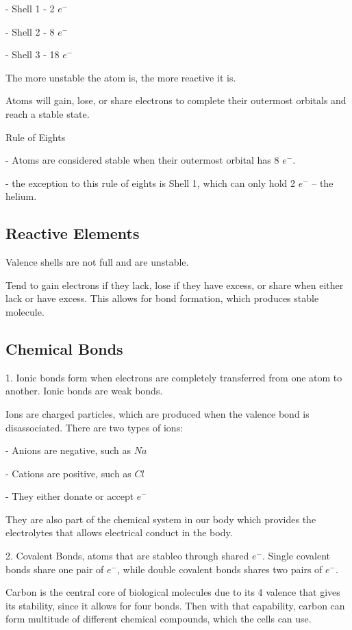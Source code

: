 \documentclass[12pt, UTF8]{article}
\begin{document}
	- Shell 1 - 2 $e^{-}$
	
	- Shell 2 - 8 $e^{-}$
	
	- Shell 3 - 18 $e^{-}$
	
	The more unstable the atom is, the more reactive it is.
	
	Atoms will gain, lose, or share electrons to complete their outermost orbitals and reach a stable state.
	
	Rule of Eights
	
	- Atoms are considered stable when their outermost orbital has 8 $e^{-}$.
	
	- the exception to this rule of eights is Shell 1, which can only hold 2 $e^{-}$ -- the helium.
	
	\subsection*{Reactive Elements}
	
	Valence shells are not full and are unstable.
	
	Tend to gain electrons if they lack, lose if they have excess, or share when either lack or have excess. This allows for bond formation, which produces stable molecule.
	
	\subsection*{Chemical Bonds}
	
	1. Ionic bonds form when electrons are completely transferred from one atom to another. Ionic bonds are weak bonds.
	
	Ions are charged particles, which are produced when the valence bond is disassociated. There are two types of ions:
	
	- Anions are negative, such as $Na$
	
	- Cations are positive, such as $Cl$
	
	- They either donate or accept $e^{-}$
	
	They are also part of the chemical system in our body which provides the electrolytes that allows electrical conduct in the body.
	
	2. Covalent Bonds, atoms that are stableo through shared $e^{-}$. Single covalent bonds share one pair of $e^{-}$, while double covalent bonds shares two pairs of $e^{-}$.
	
	Carbon is the central core of biological molecules due to its 4 valence that gives its stability, since it allows for four bonds. Then with that capability, carbon can form multitude of different chemical compounds, which the cells can use.
	
\end{document}

